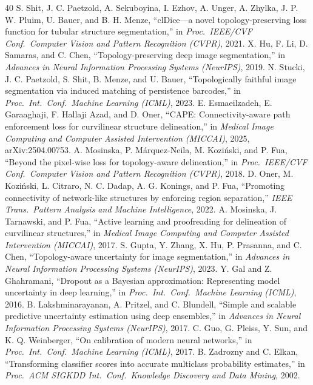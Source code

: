 \documentclass[10pt,letterpaper,journal]{IEEEtran}
\newcommand{\1}{\mathbf{1}}
\begin{document}
\balance
\begin{thebibliography}{40}
 S. Shit, J. C. Paetzold, A. Sekuboyina, I. Ezhov, A. Unger, A. Zhylka, J. P. W. Pluim, U. Bauer, and B. H. Menze, ``clDice---a novel topology-preserving loss function for tubular structure segmentation,'' in \emph{Proc.\ IEEE/CVF Conf.\ Computer Vision and Pattern Recognition (CVPR)}, 2021.
 X. Hu, F. Li, D. Samaras, and C. Chen, ``Topology-preserving deep image segmentation,'' in \emph{Advances in Neural Information Processing Systems (NeurIPS)}, 2019.
 N. Stucki, J. C. Paetzold, S. Shit, B. Menze, and U. Bauer, ``Topologically faithful image segmentation via induced matching of persistence barcodes,'' in \emph{Proc.\ Int.\ Conf.\ Machine Learning (ICML)}, 2023.
 E. Esmaeilzadeh, E. Garaaghaji, F. Hallaji Azad, and D. Oner, ``CAPE: Connectivity-aware path enforcement loss for curvilinear structure delineation,'' in \emph{Medical Image Computing and Computer Assisted Intervention (MICCAI)}, 2025, arXiv:2504.00753.
 A. Mosinska, P. M\'arquez-Neila, M. Kozi\'nski, and P. Fua, ``Beyond the pixel-wise loss for topology-aware delineation,'' in \emph{Proc.\ IEEE/CVF Conf.\ Computer Vision and Pattern Recognition (CVPR)}, 2018.
 D. Oner, M. Kozi\'nski, L. Citraro, N. C. Dadap, A. G. Konings, and P. Fua, ``Promoting connectivity of network-like structures by enforcing region separation,'' \emph{IEEE Trans.\ Pattern Analysis and Machine Intelligence}, 2022.
 A. Mosinska, J. Tarnawski, and P. Fua, ``Active learning and proofreading for delineation of curvilinear structures,'' in \emph{Medical Image Computing and Computer Assisted Intervention (MICCAI)}, 2017.
 S. Gupta, Y. Zhang, X. Hu, P. Prasanna, and C. Chen, ``Topology-aware uncertainty for image segmentation,'' in \emph{Advances in Neural Information Processing Systems (NeurIPS)}, 2023.
 Y. Gal and Z. Ghahramani, ``Dropout as a Bayesian approximation: Representing model uncertainty in deep learning,'' in \emph{Proc.\ Int.\ Conf.\ Machine Learning (ICML)}, 2016.
 B. Lakshminarayanan, A. Pritzel, and C. Blundell, ``Simple and scalable predictive uncertainty estimation using deep ensembles,'' in \emph{Advances in Neural Information Processing Systems (NeurIPS)}, 2017.
 C. Guo, G. Pleiss, Y. Sun, and K. Q. Weinberger, ``On calibration of modern neural networks,'' in \emph{Proc.\ Int.\ Conf.\ Machine Learning (ICML)}, 2017.
 B. Zadrozny and C. Elkan, ``Transforming classifier scores into accurate multiclass probability estimates,'' in \emph{Proc.\ ACM SIGKDD Int.\ Conf.\ Knowledge Discovery and Data Mining}, 2002.

\end{thebibliography}
\end{document}
